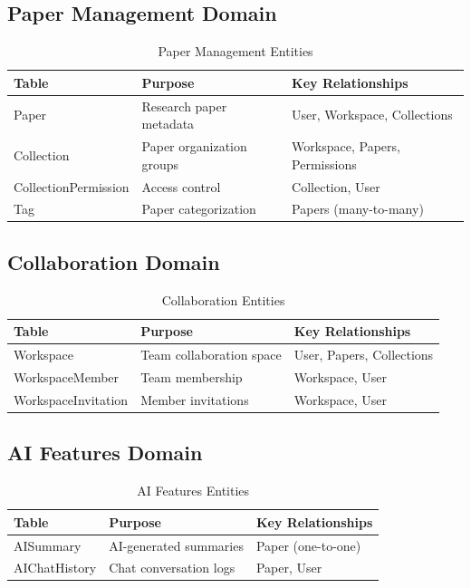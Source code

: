 \subsection{Paper Management Domain}

\begin{table}[H]
\centering
\caption{Paper Management Entities}
\label{tab:erd-paper-domain}
\begin{tabular}{@{}llp{6cm}@{}}
\toprule
\textbf{Table} & \textbf{Purpose} & \textbf{Key Relationships} \\
\midrule
Paper & Research paper metadata & User, Workspace, Collections \\
Collection & Paper organization groups & Workspace, Papers, Permissions \\
CollectionPermission & Access control & Collection, User \\
Tag & Paper categorization & Papers (many-to-many) \\
\bottomrule
\end{tabular}
\end{table}

\subsection{Collaboration Domain}

\begin{table}[H]
\centering
\caption{Collaboration Entities}
\label{tab:erd-collaboration-domain}
\begin{tabular}{@{}llp{6cm}@{}}
\toprule
\textbf{Table} & \textbf{Purpose} & \textbf{Key Relationships} \\
\midrule
Workspace & Team collaboration space & User, Papers, Collections \\
WorkspaceMember & Team membership & Workspace, User \\
WorkspaceInvitation & Member invitations & Workspace, User \\
\bottomrule
\end{tabular}
\end{table}

\subsection{AI Features Domain}

\begin{table}[H]
\centering
\caption{AI Features Entities}
\label{tab:erd-ai-domain}
\begin{tabular}{@{}llp{6cm}@{}}
\toprule
\textbf{Table} & \textbf{Purpose} & \textbf{Key Relationships} \\
\midrule
AISummary & AI-generated summaries & Paper (one-to-one) \\
AIChatHistory & Chat conversation logs & Paper, User \\
\bottomrule
\end{tabular}
\end{table}


